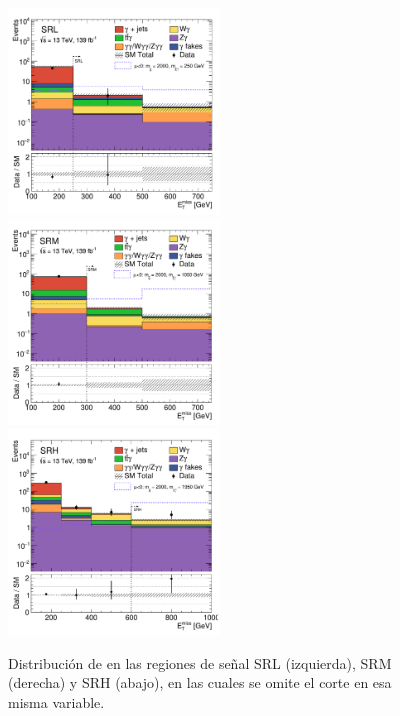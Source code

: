 \begin{figure}[!hb]
   \centering
   \includegraphics[width=0.5\textwidth]{images/results/fr2_unblind/sigReg_SRL_fr2_met_et_v2.pdf}
   \includegraphics[width=0.5\textwidth]{images/results/fr2_unblind/sigReg_SRM_fr2_met_et_v2.pdf}
   \includegraphics[width=0.5\textwidth]{images/results/fr2_unblind/sigReg_SRH_fr2_met_et_v2.pdf}
   \caption{Distribución de \met en las regiones de señal SRL (izquierda), SRM (derecha) y SRH (abajo), en las cuales se omite el corte en esa misma variable.}
   \label{fig:met_n-1_SRL_SRM_SRH_fr2}
\end{figure}



